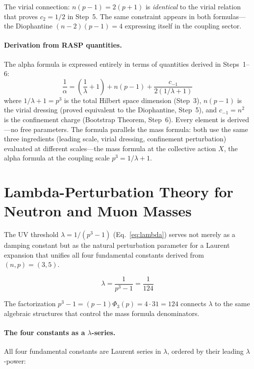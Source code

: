 \documentclass[12pt,a4paper]{article}
\theoremstyle{definition}
\newcommand{\Phithree}{\Phi_3}
\begin{document}
The virial connection: $n(p-1) = 2(p+1)$ is \emph{identical} to the
virial relation that proves $c_2 = 1/2$ in Step~5. The same constraint
appears in both formulas---the Diophantine $(n-2)(p-1) = 4$ expressing
itself in the coupling sector.

\paragraph{Derivation from RASP quantities.}
The alpha formula is expressed entirely in terms of quantities derived
in Steps~1--6:
\begin{equation}\label{eq:alpha-derived}
  \frac{1}{\alpha} = \left(\frac{1}{\lambda} + 1\right)
    + n(p-1)
    + \frac{c_{-1}}{2(1/\lambda + 1)}
\end{equation}
where $1/\lambda + 1 = p^3$ is the total Hilbert space dimension
(Step~3), $n(p-1)$ is the virial dressing (proved equivalent to the
Diophantine, Step~5), and $c_{-1} = n^2$ is the confinement charge
(Bootstrap Theorem, Step~6). Every element is derived---no free
parameters. The formula parallels the mass formula: both use the same
three ingredients (leading scale, virial dressing, confinement
perturbation) evaluated at different scales---the mass formula at the
collective action $X$, the alpha formula at the coupling scale
$p^3 = 1/\lambda + 1$.

\section{Lambda-Perturbation Theory for Neutron and Muon Masses}

The UV threshold $\lambda = 1/(p^3 - 1)$ (Eq.~\ref{eq:lambda}) serves not
merely as a damping constant but as the natural perturbation parameter for
a Laurent expansion that unifies all four fundamental constants derived
from $(n, p) = (3, 5)$.

\begin{equation}
  \lambda = \frac{1}{p^3 - 1} = \frac{1}{124}
\end{equation}

The factorization $p^3 - 1 = (p-1)\Phithree(p) = 4 \cdot 31 = 124$
connects $\lambda$ to the same algebraic structures that control the mass
formula denominators.

\paragraph{The four constants as a $\lambda$-series.}
All four fundamental constants are Laurent series in $\lambda$, ordered by
their leading $\lambda$-power:
\end{document}
